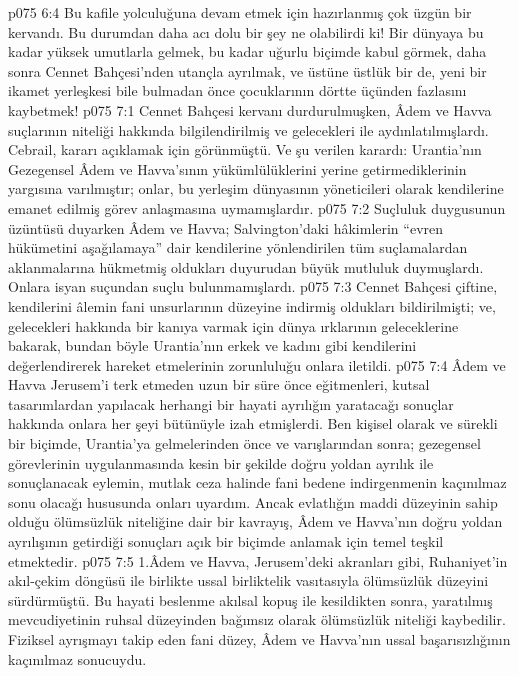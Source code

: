\vs p075 6:4 Bu kafile yolculuğuna devam etmek için hazırlanmış çok üzgün bir kervandı. Bu durumdan daha acı dolu bir şey ne olabilirdi ki! Bir dünyaya bu kadar yüksek umutlarla gelmek, bu kadar uğurlu biçimde kabul görmek, daha sonra Cennet Bahçesi’nden utançla ayrılmak, ve üstüne üstlük bir de, yeni bir ikamet yerleşkesi bile bulmadan önce çocuklarının dörtte üçünden fazlasını kaybetmek!
\vs p075 7:1 Cennet Bahçesi kervanı durdurulmuşken, Âdem ve Havva suçlarının niteliği hakkında bilgilendirilmiş ve gelecekleri ile aydınlatılmışlardı. Cebrail, kararı açıklamak için görünmüştü. Ve şu verilen karardı: Urantia’nın Gezegensel Âdem ve Havva’sının yükümlülüklerini yerine getirmediklerinin yargısına varılmıştır; onlar, bu yerleşim dünyasının yöneticileri olarak kendilerine emanet edilmiş görev anlaşmasına uymamışlardır.
\vs p075 7:2 Suçluluk duygusunun üzüntüsü duyarken Âdem ve Havva; Salvington’daki hâkimlerin “evren hükümetini aşağılamaya” dair kendilerine yönlendirilen tüm suçlamalardan aklanmalarına hükmetmiş oldukları duyurudan büyük mutluluk duymuşlardı. Onlara isyan suçundan suçlu bulunmamışlardı.
\vs p075 7:3 Cennet Bahçesi çiftine, kendilerini âlemin fani unsurlarının düzeyine indirmiş oldukları bildirilmişti; ve, gelecekleri hakkında bir kanıya varmak için dünya ırklarının geleceklerine bakarak, bundan böyle Urantia’nın erkek ve kadını gibi kendilerini değerlendirerek hareket etmelerinin zorunluluğu onlara iletildi.
\vs p075 7:4 Âdem ve Havva Jerusem’i terk etmeden uzun bir süre önce eğitmenleri, kutsal tasarımlardan yapılacak herhangi bir hayati ayrılığın yaratacağı sonuçlar hakkında onlara her şeyi bütünüyle izah etmişlerdi. Ben kişisel olarak ve sürekli bir biçimde, Urantia’ya gelmelerinden önce ve varışlarından sonra; gezegensel görevlerinin uygulanmasında kesin bir şekilde doğru yoldan ayrılık ile sonuçlanacak eylemin, mutlak ceza halinde fani bedene indirgenmenin kaçınılmaz sonu olacağı hususunda onları uyardım. Ancak evlatlığın maddi düzeyinin sahip olduğu ölümsüzlük niteliğine dair bir kavrayış, Âdem ve Havva’nın doğru yoldan ayrılışının getirdiği sonuçları açık bir biçimde anlamak için temel teşkil etmektedir.
\vs p075 7:5 1.\bibnobreakspace Âdem ve Havva, Jerusem’deki akranları gibi, Ruhaniyet’in akıl\hyp{}çekim döngüsü ile birlikte ussal birliktelik vasıtasıyla ölümsüzlük düzeyini sürdürmüştü. Bu hayati beslenme akılsal kopuş ile kesildikten sonra, yaratılmış mevcudiyetinin ruhsal düzeyinden bağımsız olarak ölümsüzlük niteliği kaybedilir. Fiziksel ayrışmayı takip eden fani düzey, Âdem ve Havva’nın ussal başarısızlığının kaçınılmaz sonucuydu.
